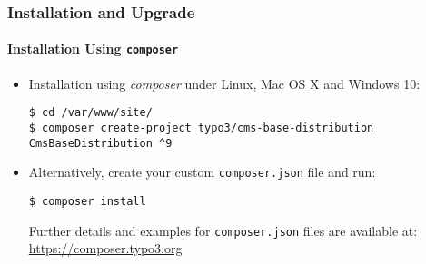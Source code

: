 
\begin{frame}[fragile]
	\frametitle{Installation and Upgrade}
	\framesubtitle{Installation Using \texttt{composer}}

	\begin{itemize}
		\item Installation using \textit{composer} under Linux, Mac OS X and Windows 10:

			\begin{lstlisting}
$ cd /var/www/site/
$ composer create-project typo3/cms-base-distribution CmsBaseDistribution ^9
			\end{lstlisting}

		\item Alternatively, create your custom \texttt{composer.json} file and run:

			\begin{lstlisting}
$ composer install
			\end{lstlisting}

			Further details and examples for \texttt{composer.json} files are available at:\newline
			\smaller
				\href{https://composer.typo3.org}{https://composer.typo3.org}
			\normalsize

	\end{itemize}
\end{frame}

